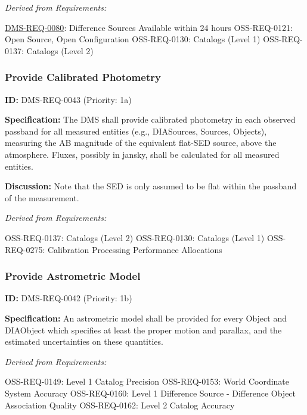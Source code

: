 \documentclass[SE,toc,lsstdraft]{lsstdoc}
\begin{document}
\emph{Derived from Requirements:}

\hyperref[DMS-REQ-0080]{DMS-REQ-0080}:
Difference Sources Available within 24 hours \newline
OSS-REQ-0121:
Open Source, Open Configuration \newline
OSS-REQ-0130:
Catalogs (Level 1) \newline
OSS-REQ-0137:
Catalogs (Level 2) \newline

\subsubsection{Provide Calibrated Photometry}

\label{DMS-REQ-0043}
\textbf{ID:} DMS-REQ-0043 (Priority: 1a)

\textbf{Specification:} The DMS shall provide calibrated photometry in each observed passband for all measured entities (e.g., DIASources, Sources, Objects), measuring the AB magnitude of the equivalent flat-SED source, above the atmosphere. Fluxes, possibly in jansky, shall be calculated for all measured entities.

\textbf{Discussion: }Note that the SED is only assumed to be flat within the passband of the measurement.

\emph{Derived from Requirements:}

OSS-REQ-0137:
Catalogs (Level 2) \newline
OSS-REQ-0130:
Catalogs (Level 1) \newline
OSS-REQ-0275:
Calibration Processing Performance Allocations \newline

\subsubsection{Provide Astrometric Model}

\label{DMS-REQ-0042}
\textbf{ID:} DMS-REQ-0042 (Priority: 1b)

\textbf{Specification:} An astrometric model shall be provided for every Object and DIAObject which specifies at least the proper motion and parallax, and the estimated uncertainties on these quantities.

\emph{Derived from Requirements:}

OSS-REQ-0149:
Level 1 Catalog Precision \newline
OSS-REQ-0153:
World Coordinate System Accuracy \newline
OSS-REQ-0160:
Level 1 Difference Source - Difference Object Association Quality \newline
OSS-REQ-0162:
Level 2 Catalog Accuracy \newline
\end{document}
